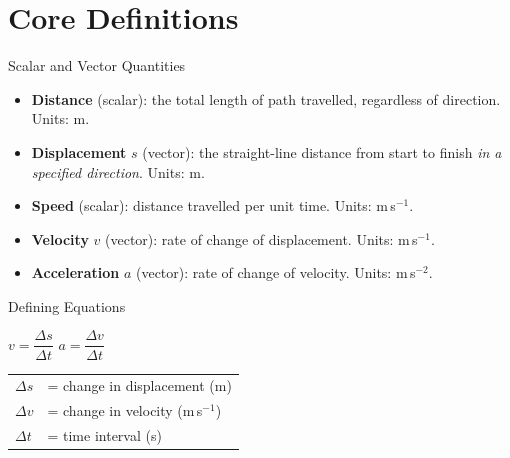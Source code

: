 

\section{Core Definitions}

\begin{definitionbox}{Scalar and Vector Quantities}
\begin{itemize}[itemsep=3pt]
  \item \textbf{Distance} (scalar): the total length of path travelled, regardless of direction. Units: m.
  \item \textbf{Displacement} $s$ (vector): the straight-line distance from start to finish \emph{in a specified direction}. Units: m.
  \item \textbf{Speed} (scalar): distance travelled per unit time. Units: m\,s$^{-1}$.
  \item \textbf{Velocity} $v$ (vector): rate of change of displacement. Units: m\,s$^{-1}$.
  \item \textbf{Acceleration} $a$ (vector): rate of change of velocity. Units: m\,s$^{-2}$.
\end{itemize}
\end{definitionbox}

\begin{formulabox}{Defining Equations}
\begin{center}
\large
$v = \dfrac{\Delta s}{\Delta t}$ \qquad\qquad $a = \dfrac{\Delta v}{\Delta t}$
\end{center}
\vspace{0.3em}
\begin{tabular}{@{}ll@{}}
$\Delta s$ & = change in displacement (m) \\
$\Delta v$ & = change in velocity (m\,s$^{-1}$) \\
$\Delta t$ & = time interval (s) \\
\end{tabular}
\end{formulabox}

